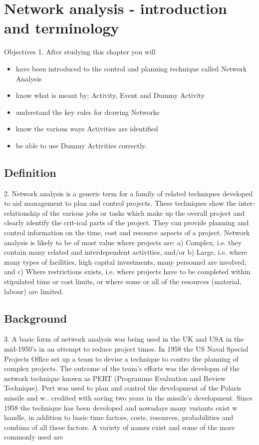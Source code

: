 \documentclass[]{report}
\begin{document}

\section*{ Network analysis - introduction and terminology }
Objectives 1. After studying this chapter you will 
\begin{itemize}
\item  have been introduced to the control and planning technique called Network Analysis \item  know what is meant by; Activity, Event and Dummy Activity \item  understand the key rules for drawing Networks \item  know the various ways Activities are identified \item  be able to use Dummy Activities correctly. 
\end{itemize}
\subsection{Definition} 2. Network analysis is a generic term for a family of related techniques developed to aid management to plan and control projects. These techniques show the inter-relationship of the various jobs or tasks which make up the overall project and clearly identify the crit-ical parts of the project. They can provide planning and control information on the time, cost and resource aspects of a project. Network analysis is likely to be of most value where projects are: a) Complex, i.e. they contain many related and interdependent activities, and/or b) Large, i.e. where many types of facilities, high capital investments, many personnel are involved; and c) Where restrictions exists, i.e. where projects have to be completed within stipulated time or cost limits, or where some or all of the resources (material, labour) are limited. 
\subsection{Background} 3. A basic form of network analysis was being used in the UK and USA in the mid-1950's in an attempt to reduce project times. 
In 1958 the US Naval Special Projects Office set up a team to devise a technique to contro the planning of complex projects. 
The outcome of the team's efforts was the developm of the network technique known as PERT (Programme Evaluation and Review Technique). 
Pert was used to plan and control the development of the Polaris missile and w.. credited with saving two years in the missile's development. 
Since 1958 the technique has been developed and nowadays many variants exist w handle, in addition to basic time factors, costs, resources, probabilities and 
combina of all these factors. A variety of names exist and some of the more commonly used are
\end{document}
